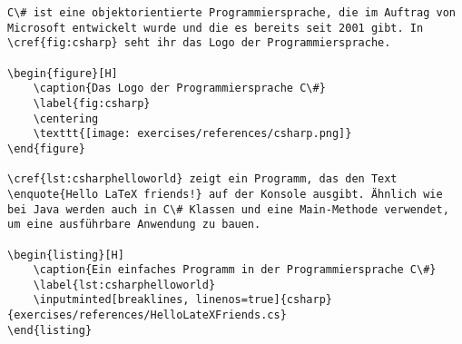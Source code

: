 \begin{verbatim}
C\# ist eine objektorientierte Programmiersprache, die im Auftrag von Microsoft entwickelt wurde und die es bereits seit 2001 gibt. In \cref{fig:csharp} seht ihr das Logo der Programmiersprache. 
	
\begin{figure}[H]
	\caption{Das Logo der Programmiersprache C\#}
	\label{fig:csharp}
	\centering
	\texttt{[image: exercises/references/csharp.png]}
\end{figure}

\cref{lst:csharphelloworld} zeigt ein Programm, das den Text \enquote{Hello LaTeX friends!} auf der Konsole ausgibt. Ähnlich wie bei Java werden auch in C\# Klassen und eine Main-Methode verwendet, um eine ausführbare Anwendung zu bauen. 
	
\begin{listing}[H]
	\caption{Ein einfaches Programm in der Programmiersprache C\#}
	\label{lst:csharphelloworld}
	\inputminted[breaklines, linenos=true]{csharp}{exercises/references/HelloLateXFriends.cs}
\end{listing}
\end{verbatim}



	


